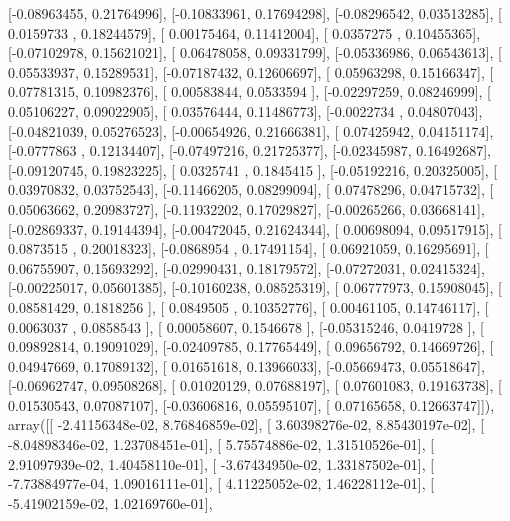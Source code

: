 \documentclass{article}
\begin{document}
       [-0.08963455,  0.21764996],
       [-0.10833961,  0.17694298],
       [-0.08296542,  0.03513285],
       [ 0.0159733 ,  0.18244579],
       [ 0.00175464,  0.11412004],
       [ 0.0357275 ,  0.10455365],
       [-0.07102978,  0.15621021],
       [ 0.06478058,  0.09331799],
       [-0.05336986,  0.06543613],
       [ 0.05533937,  0.15289531],
       [-0.07187432,  0.12606697],
       [ 0.05963298,  0.15166347],
       [ 0.07781315,  0.10982376],
       [ 0.00583844,  0.0533594 ],
       [-0.02297259,  0.08246999],
       [ 0.05106227,  0.09022905],
       [ 0.03576444,  0.11486773],
       [-0.0022734 ,  0.04807043],
       [-0.04821039,  0.05276523],
       [-0.00654926,  0.21666381],
       [ 0.07425942,  0.04151174],
       [-0.0777863 ,  0.12134407],
       [-0.07497216,  0.21725377],
       [-0.02345987,  0.16492687],
       [-0.09120745,  0.19823225],
       [ 0.0325741 ,  0.1845415 ],
       [-0.05192216,  0.20325005],
       [ 0.03970832,  0.03752543],
       [-0.11466205,  0.08299094],
       [ 0.07478296,  0.04715732],
       [ 0.05063662,  0.20983727],
       [-0.11932202,  0.17029827],
       [-0.00265266,  0.03668141],
       [-0.02869337,  0.19144394],
       [-0.00472045,  0.21624344],
       [ 0.00698094,  0.09517915],
       [ 0.0873515 ,  0.20018323],
       [-0.0868954 ,  0.17491154],
       [ 0.06921059,  0.16295691],
       [ 0.06755907,  0.15693292],
       [-0.02990431,  0.18179572],
       [-0.07272031,  0.02415324],
       [-0.00225017,  0.05601385],
       [-0.10160238,  0.08525319],
       [ 0.06777973,  0.15908045],
       [ 0.08581429,  0.1818256 ],
       [ 0.0849505 ,  0.10352776],
       [ 0.00461105,  0.14746117],
       [ 0.0063037 ,  0.0858543 ],
       [ 0.00058607,  0.1546678 ],
       [-0.05315246,  0.0419728 ],
       [ 0.09892814,  0.19091029],
       [-0.02409785,  0.17765449],
       [ 0.09656792,  0.14669726],
       [ 0.04947669,  0.17089132],
       [ 0.01651618,  0.13966033],
       [-0.05669473,  0.05518647],
       [-0.06962747,  0.09508268],
       [ 0.01020129,  0.07688197],
       [ 0.07601083,  0.19163738],
       [ 0.01530543,  0.07087107],
       [-0.03606816,  0.05595107],
       [ 0.07165658,  0.12663747]]), array([[ -2.41156348e-02,   8.76846859e-02],
       [  3.60398276e-02,   8.85430197e-02],
       [ -8.04898346e-02,   1.23708451e-01],
       [  5.75574886e-02,   1.31510526e-01],
       [  2.91097939e-02,   1.40458110e-01],
       [ -3.67434950e-02,   1.33187502e-01],
       [ -7.73884977e-04,   1.09016111e-01],
       [  4.11225052e-02,   1.46228112e-01],
       [ -5.41902159e-02,   1.02169760e-01],
\end{document}

